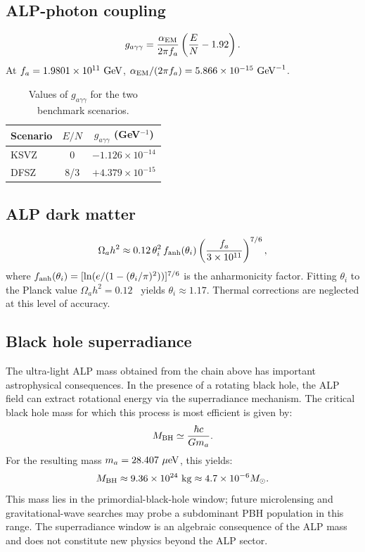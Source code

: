 \documentclass[12pt,a4paper]{article}
\numberwithin{equation}{section}
\begin{document}
\subsection{ALP-photon coupling}
\begin{equation}
g_{a\gamma\gamma} = \frac{\alpha_{\rm EM}}{2\pi f_a}\left(\frac{E}{N} -1.92\right).
\end{equation}
At \(f_a = 1.9801\times 10^{11}~{\rm GeV}\), \(\alpha_{\rm EM}/(2\pi f_a) = 5.866\times 10^{-15}~{\rm GeV}^{-1}\).

\begin{table}[H]
\centering
\caption{Values of \(g_{a\gamma\gamma}\) for the two benchmark scenarios.}
\begin{tabular}{lcc}
\toprule
Scenario & \(E/N\) & \(g_{a\gamma\gamma}\) (GeV\(^{-1}\)) \\
\midrule
KSVZ & 0 & \(-1.126 \times 10^{-14}\) \\
DFSZ & 8/3 & \(+4.379 \times 10^{-15}\) \\
\bottomrule
\end{tabular}
\end{table}

\subsection{ALP dark matter}
\begin{equation}
\Omega_a h^2 \approx 0.12\,\theta_i^2\, f_{\rm anh}(\theta_i)\left(\frac{f_a}{3\times 10^{11}}\right)^{7/6},
\end{equation}
where \(f_{\rm anh}(\theta_i) = [\ln(e/(1-(\theta_i/\pi)^2))]^{7/6}\) is the anharmonicity factor.
Fitting $\theta_i$ to the Planck value $\Omega_a h^2 = 0.12$~\cite{Planck2018} yields $\theta_i \approx 1.17$. Thermal corrections are neglected at this level of accuracy.

\subsection{Black hole superradiance}
The ultra-light ALP mass obtained from the chain above has important astrophysical consequences. In the presence of a rotating black hole, the ALP field can extract rotational energy via the superradiance mechanism. The critical black hole mass for which this process is most efficient is given by:
\begin{equation}
M_{\rm BH}\simeq \frac{\hbar c}{Gm_a}.
\end{equation}
For the resulting mass \(m_a = 28.407~\mu{\rm eV}\), this yields:
\begin{equation}
M_{\rm BH}\approx 9.36\times 10^{24}~{\rm kg}\approx 4.7\times 10^{-6}M_{\odot}.
\end{equation}
This mass lies in the primordial-black-hole window; future microlensing and gravitational-wave searches may probe a subdominant PBH population in this range. The superradiance window is an algebraic consequence of the ALP mass and does not constitute new physics beyond the ALP sector.
\end{document}
